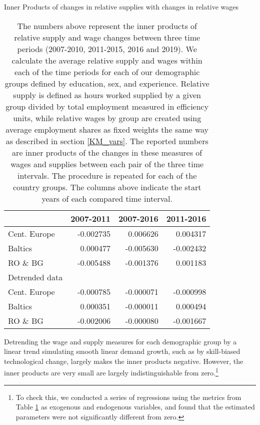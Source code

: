 \documentclass[11pt]{article}
\begin{document}
\begin{table}[!htbp]
\centering 
\caption{Inner Products of changes in relative supplies with changes in relative wages}
\label{inner_products_ls_w}
\begin{center}

\begin{tabular}{lrrr}
\toprule
{} &  2007-2011 &  2007-2016 &  2011-2016 \\
\midrule

Cent. Europe &  -0.002735 &   0.006626 &   0.004317 \\
Baltics   &   0.000477 &  -0.005630 &  -0.002432 \\
RO \& BG   &  -0.005488 &  -0.001376 &   0.001183 \\
\midrule
Detrended data\\
\midrule
Cent. Europe &  -0.000785 &  -0.000071 &  -0.000998 \\
Baltics   &   0.000351 &  -0.000011 &   0.000494 \\
RO \& BG   &  -0.002006 &  -0.000080 &  -0.001667 \\
\bottomrule
\end{tabular}
\caption*{\footnotesize  The numbers above represent the inner products of relative supply and wage changes between three time periods (2007-2010, 2011-2015, 2016 and 2019). We calculate the average relative supply and wages within each of the time periods for each of our demographic groups defined by education, sex, and experience. Relative supply is defined as hours worked supplied by a given group divided by total employment measured in efficiency units, while relative wages by group are created using average employment shares as fixed weights the same way as described in section \ref{KM_vars}. The reported numbers are inner products of the changes in these measures of wages and supplies between each pair of the three time intervals. The procedure is repeated for each of the country groups. The columns above indicate the start years of each compared time interval.}
\end{center}
\end{table}

Detrending the wage and supply measures for each demographic group by a linear trend simulating smooth linear demand growth, such as by skill-biased technological change, largely makes the inner products negative. However, the inner products are very small are largely indistinguishable from zero.\footnote{To check this, we conducted a series of regressions using the metrics from Table \ref{inner_products_ls_w} as exogenous and endogenous variables, and found that the estimated parameters were not significantly different from zero.}
\end{document}
